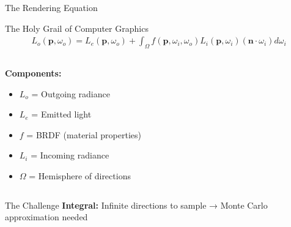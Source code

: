 \begin{frame}{The Rendering Equation}
    \begin{center}
        \begin{mathbox}{The Holy Grail of Computer Graphics}
            \begin{align}
                L_o(\mathbf{p}, \omega_o) = L_e(\mathbf{p}, \omega_o) + \int_\Omega f(\mathbf{p}, \omega_i, \omega_o) L_i(\mathbf{p}, \omega_i) (\mathbf{n} \cdot \omega_i) d\omega_i
            \end{align}
        \end{mathbox}
    \end{center}

    \begin{columns}
        \begin{column}{0.5\textwidth}
            \textbf{Components:}
            \begin{itemize}
                \item $L_o$ = Outgoing radiance
                \item $L_e$ = Emitted light
                \item $f$ = BRDF (material properties)
                \item $L_i$ = Incoming radiance
                \item $\Omega$ = Hemisphere of directions
            \end{itemize}
        \end{column}
        \begin{column}{0.5\textwidth}
        \end{column}
    \end{columns}

    \begin{conceptbox}{The Challenge}
        \textbf{Integral:} Infinite directions to sample → Monte Carlo approximation needed
    \end{conceptbox}
\end{frame}

